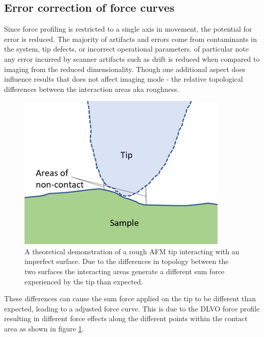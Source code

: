\newpage

\subsection{Error correction of force curves}

Since force profiling is restricted to a single axis in movement, the potential for error is reduced. The majority of artifacts and errors come from contaminants in the system, tip defects, or incorrect operational parameters. of particular note any error incurred by scanner artifacts such as drift is reduced when compared to imaging from the reduced dimensionality. Though one additional aspect does influence results that does not affect imaging mode - the relative topological differences between the interaction areas aka roughness. \cite{TipRoughness}

\begin{figure}[h!]     %
        \begin{center}
          \includegraphics[width=100mm]{chapter2/tip contact.PNG}
\end{center}
\caption{A theoretical demonstration of a rough AFM tip interacting with an imperfect surface. Due to the differences in topology between the two surfaces the interacting areas generate a different sum force experienced by the tip than expected.}
\label{fig:tipCont}                 %
\end{figure}

These differences can cause the sum force applied on the tip to be different than expected, leading to a adjusted force curve. This is due to the DLVO force profile resulting in different force effects along the different points within the contact area as shown in figure \ref{fig:tipCont}.

